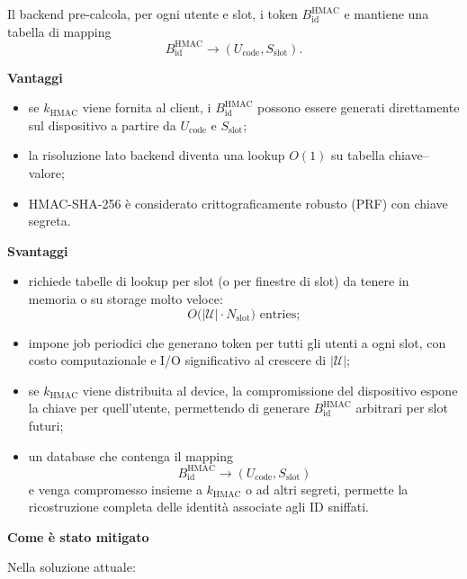 \documentclass[a4paper,11pt]{article}
\begin{document}
Il backend pre-calcola, per ogni utente e slot, i token \(B_{\text{id}}^{\mathrm{HMAC}}\) e mantiene
una tabella di mapping
\[
  B_{\text{id}}^{\mathrm{HMAC}} \longrightarrow (U_{\text{code}}, S_{\text{slot}}).
\]

\textbf{Vantaggi}

\begin{itemize}[nosep]
  \item se \(k_{\text{HMAC}}\) viene fornita al client, i \(B_{\text{id}}^{\mathrm{HMAC}}\) possono
        essere generati direttamente sul dispositivo a partire da \(U_{\text{code}}\) e
        \(S_{\text{slot}}\);
  \item la risoluzione lato backend diventa una lookup \(O(1)\) su tabella chiave–valore;
  \item HMAC-SHA-256 è considerato crittograficamente robusto (PRF) con chiave segreta.
\end{itemize}

\textbf{Svantaggi}

\begin{itemize}[nosep]
  \item richiede tabelle di lookup per slot (o per finestre di slot) da tenere in memoria o su
        storage molto veloce:
        \[
          O\bigl(|\mathcal{U}| \cdot N_{\text{slot}}\bigr) \text{ entries};
        \]
  \item impone job periodici che generano token per tutti gli utenti a ogni slot, con costo
        computazionale e I/O significativo al crescere di \(|\mathcal{U}|\);
  \item se \(k_{\text{HMAC}}\) viene distribuita al device, la compromissione del dispositivo
        espone la chiave per quell’utente, permettendo di generare \(B_{\text{id}}^{\mathrm{HMAC}}\)
        arbitrari per slot futuri;
  \item un database che contenga il mapping
        \[
          B_{\text{id}}^{\mathrm{HMAC}} \longrightarrow (U_{\text{code}}, S_{\text{slot}})
        \]
        e venga compromesso insieme a \(k_{\text{HMAC}}\) o ad altri segreti, permette la
        ricostruzione completa delle identità associate agli ID sniffati.
\end{itemize}

\textbf{Come è stato mitigato}

Nella soluzione attuale:
\end{document}
